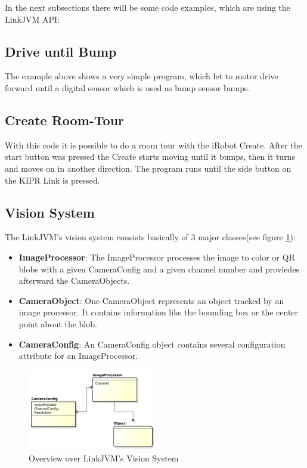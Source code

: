 \documentclass{juniorjournal}
\begin{document}
In the next subsections there will be some code examples, which are using the 
LinkJVM API:

\subsection{Drive until Bump}

The example above shows a very simple program, which let to motor drive forward 
until a digital sensor which is used as bump sensor bumps.

\newpage
\subsection{Create Room-Tour}

With this code it is possible to do a room tour with the iRobot Create.
After the start button was pressed the Create starts moving until it bumps, then 
it turns and moves on in another direction. The program runs until the side 
button on the KIPR Link is pressed.

\subsection{Vision System}
The LinkJVM's vision system consists basically of 3 major classes(see figure \ref{fig:Vision-System}):
\begin{itemize}
	\item {\bf ImageProcessor}: The ImageProcessor processes the image to color or QR blobs with a given CameraConfig and a given channel number and proviedes afterward the CameraObjects. 
	\item {\bf CameraObject}: One CameraObject represents an object tracked by an image processor. It contains information like the bounding box or the center point about the blob.
	\item {\bf CameraConfig}: An CameraConfig object contains several configuration attribute for an ImageProcessor.
\end{itemize}
\begin{figure}[htbp]
\centering
\includegraphics[width=0.5\textwidth]{images/vision.pdf}
\caption{Overview over LinkJVM's Vision System}
\label{fig:Vision-System}
\end{figure}
\end{document}
